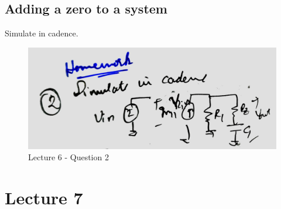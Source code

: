 \documentclass[a4paper]{article}
\begin{document}
\subsection{Adding a zero to a system}
Simulate in cadence.
\begin{figure}
    \centering
    \includegraphics[width=0.8\linewidth]{images/Lec_6_Q_2.jpeg}
    \caption{Lecture 6 - Question 2}
\end{figure}
\section{Lecture 7}
\end{document}
